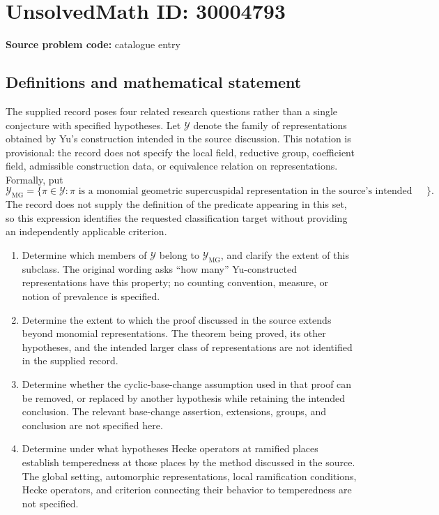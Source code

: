 \documentclass[11pt]{article}
\begin{document}
\section*{UnsolvedMath ID: 30004793}
\textbf{Source problem code:} catalogue entry
\subsection{Definitions and mathematical statement}
The supplied record poses four related research questions rather than a single conjecture with specified hypotheses. Let \(\mathcal{Y}\) denote the family of representations obtained by Yu's construction intended in the source discussion. This notation is provisional: the record does not specify the local field, reductive group, coefficient field, admissible construction data, or equivalence relation on representations. Formally, put
\[
\mathcal{Y}_{\mathrm{MG}}
=\{\pi\in\mathcal{Y}:\pi\text{ is a monomial geometric supercuspidal representation in the source's intended sense}\}.
\]
The record does not supply the definition of the predicate appearing in this set, so this expression identifies the requested classification target without providing an independently applicable criterion.

\begin{enumerate}
\item Determine which members of \(\mathcal{Y}\) belong to \(\mathcal{Y}_{\mathrm{MG}}\), and clarify the extent of this subclass. The original wording asks ``how many'' Yu-constructed representations have this property; no counting convention, measure, or notion of prevalence is specified.
\item Determine the extent to which the proof discussed in the source extends beyond monomial representations. The theorem being proved, its other hypotheses, and the intended larger class of representations are not identified in the supplied record.
\item Determine whether the cyclic-base-change assumption used in that proof can be removed, or replaced by another hypothesis while retaining the intended conclusion. The relevant base-change assertion, extensions, groups, and conclusion are not specified here.
\item Determine under what hypotheses Hecke operators at ramified places establish temperedness at those places by the method discussed in the source. The global setting, automorphic representations, local ramification conditions, Hecke operators, and criterion connecting their behavior to temperedness are not specified.
\end{enumerate}
\end{document}
